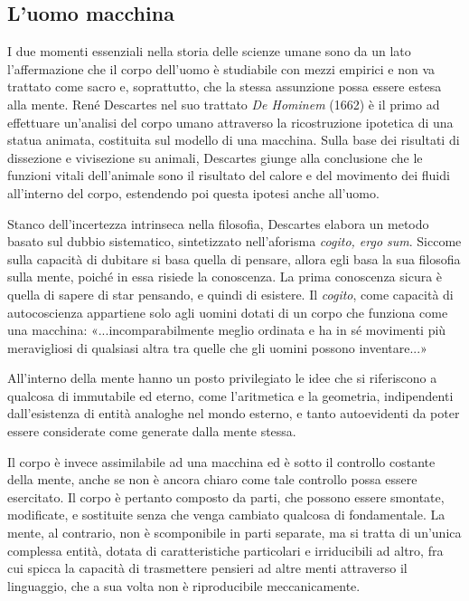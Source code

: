 \subsection{L'uomo macchina}
I due momenti essenziali nella storia delle scienze umane sono da un lato l'affermazione che il corpo dell'uomo è studiabile con mezzi empirici e non va trattato come sacro e, soprattutto, che la stessa assunzione possa essere estesa alla mente. René Descartes nel suo trattato \emph{De Hominem} (1662) è il primo ad effettuare un'analisi del corpo umano attraverso la ricostruzione ipotetica di una statua animata, costituita sul modello di una macchina. Sulla base dei risultati di dissezione e vivisezione su animali, Descartes giunge alla conclusione che le funzioni vitali dell'animale sono il risultato del calore e del movimento dei fluidi all'interno del corpo, estendendo poi questa ipotesi anche all'uomo.

Stanco dell'incertezza intrinseca nella filosofia, Descartes elabora un metodo basato sul dubbio sistematico, sintetizzato nell'aforisma \emph{cogito, ergo sum}. Siccome sulla capacità di dubitare si basa quella di pensare, allora egli basa la sua filosofia sulla mente, poiché in essa risiede la conoscenza. La prima conoscenza sicura è quella di sapere di star pensando, e quindi di esistere. Il \emph{cogito}, come capacità di autocoscienza appartiene solo agli uomini dotati di un corpo che funziona come una macchina: «...incomparabilmente meglio ordinata e ha in sé movimenti più meravigliosi di qualsiasi altra tra quelle che gli uomini possono inventare...»

All'interno della mente hanno un posto privilegiato le idee che si riferiscono a qualcosa di immutabile ed eterno, come l'aritmetica e la geometria, indipendenti dall'esistenza di entità analoghe nel mondo esterno, e tanto autoevidenti da poter essere considerate come generate dalla mente stessa.

Il corpo è invece assimilabile ad una macchina ed è sotto il controllo costante della mente, anche se non è ancora chiaro come tale controllo possa essere esercitato. Il corpo è pertanto composto da parti, che possono essere smontate, modificate, e sostituite senza che venga cambiato qualcosa di fondamentale. La mente, al contrario, non è scomponibile in parti separate, ma si tratta di un'unica complessa entità, dotata di caratteristiche particolari e irriducibili ad altro, fra cui spicca la capacità di trasmettere pensieri ad altre menti attraverso il linguaggio, che a sua volta non è riproducibile meccanicamente.

